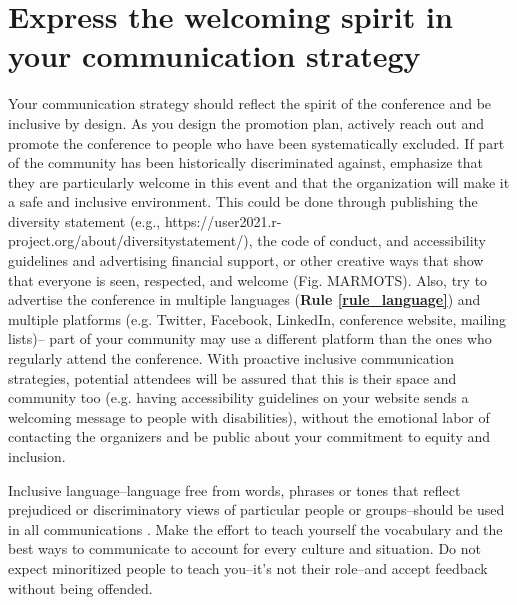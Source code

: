 \documentclass[10pt,letterpaper]{article}
\begin{document}


\section{Express the welcoming spirit in your communication strategy}
\label{rule_communication}

Your communication strategy should reflect the spirit of the conference and be inclusive by design. 
As you design the promotion plan, actively reach out and promote the conference to people who have been systematically excluded. 
If part of the community has been historically discriminated against, emphasize that they are particularly welcome in this event and that the organization will make it a safe and inclusive environment. This could be done through publishing the diversity statement (e.g., https://user2021.r-project.org/about/diversitystatement/), the code of conduct, and accessibility guidelines and advertising financial support, or other creative ways that show that everyone is seen, respected, and welcome (Fig. MARMOTS).
Also, try to advertise the conference in multiple languages (\textbf{Rule \ref{rule_language}}) and multiple platforms (e.g. Twitter, Facebook, LinkedIn, conference website, mailing lists)--
part of your community may use a different platform than the ones who regularly attend the conference. 
With proactive inclusive communication strategies, potential attendees will be assured that this is their space and community too (e.g. having accessibility guidelines on your website sends a welcoming message to people with disabilities), without the emotional labor of contacting the organizers and be public about your commitment to equity and inclusion.

Inclusive language--language free from words, phrases or tones that reflect prejudiced or discriminatory views of particular people or groups--should be used in all communications \cite{hallDesigningDiversityInclusion2019}.
Make the effort to teach yourself the vocabulary and the best ways to communicate to account for every culture and situation. 
Do not expect minoritized people to teach you--it's not their role--and accept feedback without being offended.
\end{document}
